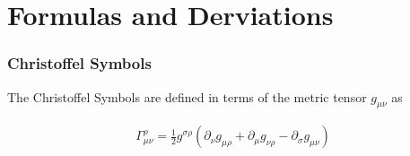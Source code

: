 \chapter{Formulas and Derviations}\label{Appendix C}

\subsection{Christoffel Symbols}

The Christoffel Symbols are defined in terms of the metric tensor $g_{\mu \nu}$ as 

\begin{align}
\Gamma^{\rho}_{\mu \nu} = \frac{1}{2}g^{\sigma \rho}(\partial_{\nu}g_{\mu \rho} + \partial_{\mu}g_{\nu \rho} - \partial_{\sigma}g_{\mu \nu})
\end{align}

\clearpage
\newpage

